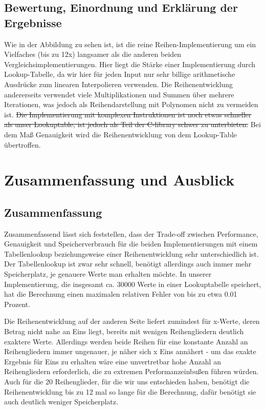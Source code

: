 \documentclass[course=erap] {aspdoc}
\begin{document}
     \subsection{Bewertung, Einordnung und Erklärung der Ergebnisse}
     Wie in der Abbildung zu sehen ist, ist die reine Reihen-Implementierung um ein Vielfaches (bis zu 12x) langsamer als die anderen
     beiden Vergleichsimplementierungen.
     Hier liegt die Stärke einer Implementierung durch Lookup-Tabelle, da wir hier für jeden
     Input nur sehr billige arithmetische Ausdrücke zum linearen Interpolieren verwenden.
     Die Reihenentwicklung andererseits verwendet viele Multiplikationen und Summen über mehrere Iterationen, was jedoch als Reihendarstellung mit Polynomen nicht zu vermeiden ist.
     \sout{Die Implementierung mit komplexen Instruktionen ist noch etwas schneller als unser Lookuptable, ist jedoch als Teil der
     C-library schwer zu unterbieten.} Bei dem Maß Genauigkeit wird die Reihenentwicklung von dem Lookup-Table übertroffen.
 
     \section{Zusammenfassung und Ausblick}
     \subsection{Zusammenfassung}
     Zusammenfassend lässt sich feststellen, dass der Trade-off zwischen Performance, Genauigkeit und Speicherverbrauch für die beiden Implementierungen mit einem Tabellenlookup beziehungsweise einer Reihenentwicklung sehr unterschiedlich ist.
     Der Tabellenlookup ist zwar sehr schnell, benötigt allerdings auch immer mehr Speicherplatz, je genauere Werte man erhalten möchte.
     In unserer Implementierung, die insgesamt ca. 30000 Werte in einer Lookuptabelle speichert, hat die Berechnung einen maximalen relativen Fehler von bis zu etwa 0.01 Prozent.
 
     Die Reihenentwicklung auf der anderen Seite liefert zumindest für x-Werte, deren Betrag nicht nahe an Eins liegt, bereits mit wenigen Reihengliedern deutlich exaktere Werte.
     Allerdings werden beide Reihen für eine konstante Anzahl an Reihengliedern immer ungenauer, je näher sich x Eins annähert - um das exakte Ergebnis für Eins zu erhalten wäre eine unvertretbar hohe Anzahl an Reihengliedern erforderlich, die zu extremen Performanzeinbußen führen würden.
     Auch für die 20 Reihenglieder, für die wir uns entschieden haben, benötigt die Reihenentwicklung bis zu 12 mal so lange für die Berechnung, dafür benötigt sie auch deutlich weniger Speicherplatz.
 
\end{document}
